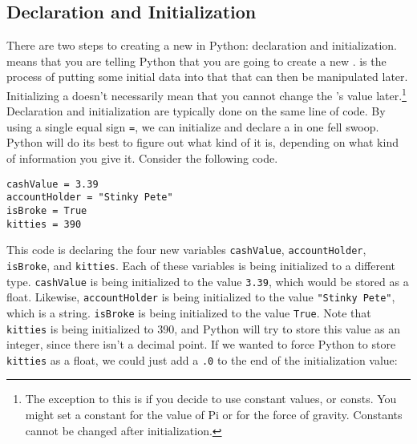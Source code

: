 \subsection{Declaration and Initialization}
There are two steps to creating a new  in Python: declaration and initialization.  means that you are telling Python that you are going to create a new .  is the process of putting some initial data into that  that can then be manipulated later. Initializing a  doesn't necessarily mean that you cannot change the 's value later.\footnote{The exception to this is if you decide to use constant values, or consts. You might set a constant for the value of Pi or for the force of gravity. Constants cannot be changed after initialization.} Declaration and initialization are typically done on the same line of code. By using a single equal sign \verb|=|, we can initialize and declare a  in one fell swoop. Python will do its best to figure out what kind of  it is, depending on what kind of information you give it. Consider the following code.\par
\begin{lstlisting}[style=pippython]
cashValue = 3.39
accountHolder = "Stinky Pete"
isBroke = True
kitties = 390
\end{lstlisting}
This code is declaring the four new variables \verb|cashValue|, \verb|accountHolder|, \verb|isBroke|, and \verb|kitties|. Each of these variables is being initialized to a different type. \verb|cashValue| is being initialized to the value \verb|3.39|, which would be stored as a float. Likewise, \verb|accountHolder| is being initialized to the value \verb|"Stinky Pete"|, which is a string. \verb|isBroke| is being initialized to the  value \verb|True|. Note that \verb|kitties| is being initialized to 390, and Python will try to store this value as an integer, since there isn't a decimal point. If we wanted to force Python to store \verb|kitties| as a float, we could just add a \verb|.0| to the end of the initialization value:\par
